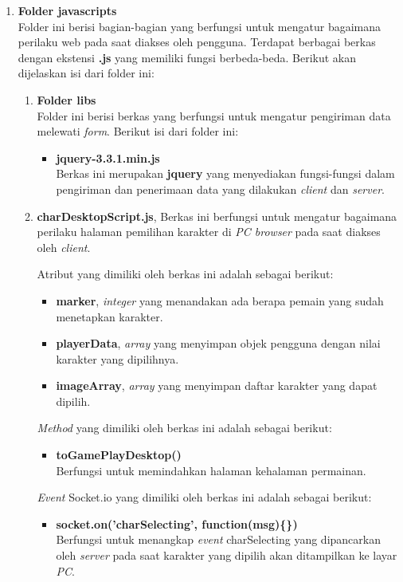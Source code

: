 \begin{enumerate}
\begin{enumerate}
		\item \textbf{Folder javascripts} \\
		Folder ini berisi bagian-bagian yang berfungsi untuk mengatur bagaimana perilaku web pada saat diakses oleh pengguna. Terdapat berbagai berkas dengan ekstensi \textbf{.js} yang memiliki fungsi berbeda-beda. Berikut akan dijelaskan isi dari folder ini:
		
		\begin{enumerate}
			\item \textbf{Folder libs} \\
			Folder ini berisi berkas yang berfungsi untuk mengatur pengiriman data melewati \textit{form}. Berikut isi dari folder ini:
			\begin{itemize}
				\item \textbf{jquery-3.3.1.min.js} \\ Berkas ini merupakan \textbf{jquery} yang menyediakan fungsi-fungsi dalam pengiriman dan penerimaan data yang dilakukan \textit{client} dan \textit{server}. 
			\end{itemize}
		
			\item \textbf{charDesktopScript.js}, Berkas ini berfungsi untuk mengatur bagaimana perilaku halaman pemilihan karakter di \textit{PC browser} pada saat diakses oleh \textit{client}.
			
			Atribut yang dimiliki oleh berkas ini adalah sebagai berikut:
			\begin{itemize}
				\item \textbf{marker}, \textit{integer} yang menandakan ada berapa pemain yang sudah menetapkan karakter.
				\item \textbf{playerData}, \textit{array} yang menyimpan objek pengguna dengan nilai karakter yang dipilihnya.
				\item \textbf{imageArray}, \textit{array} yang menyimpan daftar karakter yang dapat dipilih.
			\end{itemize}
		
			\textit{Method} yang dimiliki oleh berkas ini adalah sebagai berikut:
			\begin{itemize}
				\item \textbf{toGamePlayDesktop()} \\
				Berfungsi untuk memindahkan halaman kehalaman permainan.
			\end{itemize}
		
			\textit{Event} Socket.io yang dimiliki oleh berkas ini adalah sebagai berikut:
			\begin{itemize}
				\item \textbf{socket.on('charSelecting', function(msg)\{\})} \\
				Berfungsi untuk menangkap \textit{event} charSelecting yang dipancarkan oleh \textit{server} pada saat karakter yang dipilih akan ditampilkan ke layar \textit{PC}.
				

\end{itemize}
\end{enumerate}
\end{enumerate}
\end{enumerate}
